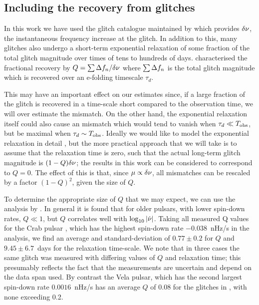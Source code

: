 \documentclass[../full_thesis/full_thesis.tex]{subfiles}
\begin{document}
\subsection{Including the recovery from glitches}
\label{sec: recovery}
In this work we have used the glitch catalogue maintained by \citet{Espinoza2011}
which provides $\delta\nu$, the instantaneous frequency increase at the
glitch. In addition to this, many glitches also undergo a short-term
exponential relaxation of some fraction of the total glitch magnitude over
times of tens to hundreds of days. \citet{Lyne2000} characterised the
fractional recovery by $Q = \sum \Delta f_n/\delta\nu$ where $\sum
\Delta f_n$ is the total glitch magnitude which is recovered over an
e-folding timescale $\tau_d$.

This may have an important effect on our estimates since, if a large fraction
of the glitch is recovered in a time-scale short compared to the observation
time, we will over estimate the mismatch. On the other hand, the exponential
relaxation itself could also cause an mismatch which would tend to vanish when
$\tau_d \ll T_{\mathrm{obs}}$, but be maximal when $\tau_d \sim T_{\mathrm{obs}}$.  Ideally we would
like to model the exponential relaxation in detail , but the more practical
approach that we will take is to assume that the relaxation time is zero, such
that the actual long-term glitch magnitude is $(1-Q)\delta\nu$; the results in
this work can be considered to correspond to $Q=0$. The effect of this is that,
since $\mu \propto \delta\nu$, all mismatches can be rescaled by a factor
$(1-Q)^{2}$, given the size of $Q$.

To determine the appropriate size of $Q$ that we may expect, we can use the
analysis by \citet{Lyne2000}. In general it is found that for older pulsars,
with lower spin-down rates, $Q\ll1$, but $Q$ correlates well with
$\log_{10}|\dot{\nu}|$. Taking all measured Q values for the Crab pulsar
\citep{Lyne2000, Wang2001, Wang2012}, which has the highest spin-down rate
$-0.038$~nHz/s in the analysis, we find an average and standard-deviation of
$0.77\pm0.2$ for $Q$ and $9.45\pm6.7$~days for the relaxation time-scale. We
note that in three cases the same glitch was measured with differing values of
$Q$ and relaxation time; this presumably reflects the fact that the
measurements are uncertain and depend on the data span used. By contrast the
Vela pulsar, which has the second largest spin-down rate $0.0016$~nHz/s has an
average $Q$ of 0.08 for the glitches in \citet{Lyne2000}, with none exceeding
0.2.
\end{document}
